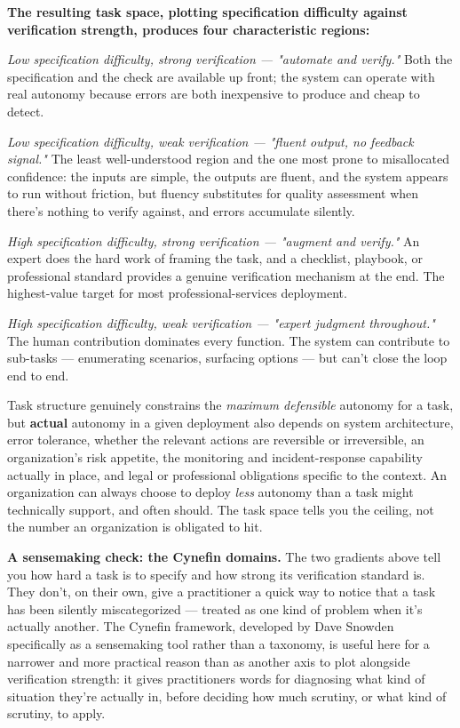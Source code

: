 \textbf{The resulting task space, plotting specification difficulty against verification strength, produces four characteristic regions:}

\emph{Low specification difficulty, strong verification --- "automate and verify."} Both the specification and the check are available up front; the system can operate with real autonomy because errors are both inexpensive to produce and cheap to detect.

\emph{Low specification difficulty, weak verification --- "fluent output, no feedback signal."} The least well-understood region and the one most prone to misallocated confidence: the inputs are simple, the outputs are fluent, and the system appears to run without friction, but fluency substitutes for quality assessment when there's nothing to verify against, and errors accumulate silently.

\emph{High specification difficulty, strong verification --- "augment and verify."} An expert does the hard work of framing the task, and a checklist, playbook, or professional standard provides a genuine verification mechanism at the end. The highest-value target for most professional-services deployment.

\emph{High specification difficulty, weak verification --- "expert judgment throughout."} The human contribution dominates every function. The system can contribute to sub-tasks --- enumerating scenarios, surfacing options --- but can't close the loop end to end.

Task structure genuinely constrains the \emph{maximum defensible} autonomy for a task, but \textbf{actual} autonomy in a given deployment also depends on system architecture, error tolerance, whether the relevant actions are reversible or irreversible, an organization's risk appetite, the monitoring and incident-response capability actually in place, and legal or professional obligations specific to the context. An organization can always choose to deploy \emph{less} autonomy than a task might technically support, and often should. The task space tells you the ceiling, not the number an organization is obligated to hit.

\textbf{A sensemaking check: the Cynefin domains.} The two gradients above tell you how hard a task is to specify and how strong its verification standard is. They don't, on their own, give a practitioner a quick way to notice that a task has been silently miscategorized --- treated as one kind of problem when it's actually another. The Cynefin framework, developed by Dave Snowden specifically as a sensemaking tool rather than a taxonomy, is useful here for a narrower and more practical reason than as another axis to plot alongside verification strength: it gives practitioners words for diagnosing what kind of situation they're actually in, before deciding how much scrutiny, or what kind of scrutiny, to apply.

